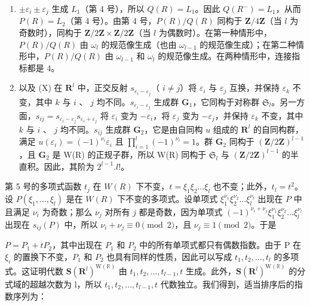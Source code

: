 \begin{enumerate}
\def\labelenumi{(\Roman{enumi})}
\setcounter{enumi}{7}
\item
  \(\pm \varepsilon_{i} \pm \varepsilon_{j}\) 生成 \(L_{1}\)（第 4 号），所以 \(Q(R) = L_{1}\)。因此 \(Q(R^{-}) = L_{1}\)，从而 \(P(R) = L_{2}\)（第 4 号）。由第 4 号，\(P(R)/Q(R)\) 同构于 \(\mathbf{Z}/4\mathbf{Z}\)（当 \(l\) 为奇数时），同构于 \(\mathbf{Z}/2\mathbf{Z} \times \mathbf{Z}/2\mathbf{Z}\)（当 \(l\) 为偶数时）。在第一种情形中，\(P(R)/Q(R)\) 由 \(\omega_{l}\) 的规范像生成（也由 \(\omega_{l-1}\) 的规范像生成）；在第二种情形中，\(P(R)/Q(R)\) 由 \(\omega_{l-1}\) 和 \(\omega_{l}\) 的规范像生成。在两种情形中，连接指标都是 4。
\item
  以及 (X) 在 \(\mathbf{R}^l\) 中，正交反射 \(s_{\varepsilon_i - \varepsilon_j}\)（ \(i \neq j\)）将 \(\varepsilon_i\) 与 \(\varepsilon_j\) 互换，并保持 \(\varepsilon_k\) 不变，其中 \(k\) 与 \(i\) 、 \(j\) 均不同。\(s_{\varepsilon_i - \varepsilon_j}\) 生成群 \(\mathbf{G}_1\)，它同构于对称群 \(\mathfrak{S}_l\)。另一方面，\(s_{ij} = s_{\varepsilon_i - \varepsilon_j} s_{\varepsilon_i + \varepsilon_j}\) 将 \(\varepsilon_i\) 变为 \(-\varepsilon_i\)，将 \(\varepsilon_j\) 变为 \(-\varepsilon_j\)，并保持 \(\varepsilon_k\) 不变，其中 \(k\) 与 \(i\) 、 \(j\) 均不同。\(s_{ij}\) 生成群 \(\mathbf{G}_2\)，它是由自同构 \(u\) 组成的 \(\mathbf{R}^l\) 的自同构群，满足 \(u(\varepsilon_i) = (-1)^{\nu_i} \varepsilon_i\) 且 \(\prod_{i=1}^{l} (-1)^{\nu_i} = 1\)。群 \(\mathbf{G}_2\) 同构于 \((\mathbf{Z}/2\mathbf{Z})^{l-1}\)，且 \(\mathbf{G}_2\) 是 W(R) 的正规子群，所以 W(R) 同构于 \(\mathfrak{S}_l\) 与 \((\mathbf{Z}/2\mathbf{Z})^{l-1}\) 的半直积。因此，其阶为 \(2^{l-1}.l!\)。
\end{enumerate}

 第 5 号的多项式函数 \(t_j\) 在 \(W(R)\) 下不变，\(t = \xi_1\xi_2\ldots\xi_l\) 也不变；此外，\(t_l = t^2\)。设 \(P(\xi_1,\ldots ,\xi_l)\) 是在 \(W(R)\) 下不变的多项式。设单项式 \(\xi_1^{\nu_1}\xi_2^{\nu_2}\ldots\xi_l^{\nu_l}\) 出现在 \(P\) 中且满足 \(\nu_{i}\) 为奇数；那么 \(\nu_{j}\) 对所有 \(j\) 都是奇数，因为单项式 \((-1)^{\nu_i + \nu_j}\xi_1^{\nu_1}\xi_2^{\nu_2}\ldots\xi_l^{\nu_l}\) 出现在 \(s_{ij}(P)\) 中，所以 \(\nu_{i} + \nu_{j} \equiv 0 \pmod{2}\)，且 \(\nu_{j} \equiv 1 \pmod{2}\)。于是

\(P = P_{1} + tP_{2}\)，其中出现在 \(P_{1}\) 和 \(P_{2}\) 中的所有单项式都只有偶数指数。由于 P 在 \(\xi_{i}\) 的置换下不变，\(P_{1}\) 和 \(P_{2}\) 也具有同样的性质，因此可以写成 \(t_{1}, t_{2}, \ldots, t_{l}\) 的多项式。这证明代数 \(\mathbf{S}(\mathbf{R}^{l})^{\mathrm{W}(\mathbb{R})}\) 由 \(t_{1}, t_{2}, \ldots, t_{l-1}, t\) 生成。此外，\(\mathbf{S}(\mathbf{R}^{l})^{\mathrm{W}(\mathbb{R})}\) 的分式域的超越次数为 l，所以 \(t_{1}, t_{2}, \ldots, t_{l-1}, t\) 代数独立。我们得到，适当排序后的指数序列为：


